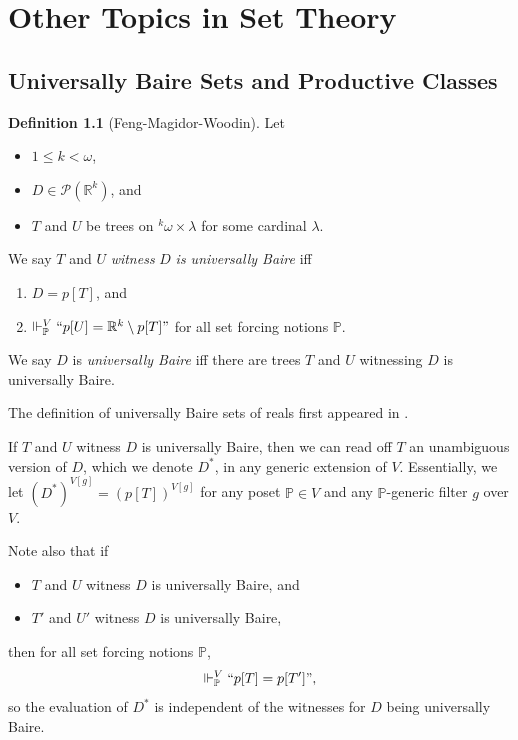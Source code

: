 \documentclass[12pt, twoside]{memoir}
\numberwithin{equation}{section}
\theoremstyle{definition}
\newtheorem{defi}[thm]{Definition}
\theoremstyle{remark}
\theoremstyle{definition}
\theoremstyle{definition}
\theoremstyle{definition}
\theoremstyle{remark}
\begin{document}
\chapter{Other Topics in Set Theory}\label{chap4}

\section{Universally Baire Sets and Productive Classes}\label{ss25}

\begin{defi}[Feng-Magidor-Woodin]
Let 
\begin{itemize}
    \item $1 \leq k < \omega$, 
    \item $D \in \mathcal{P}(\mathbb{R}^k)$, and
    \item $T$ and $U$ be trees on ${^{k}{\omega}} \times \lambda$ for some cardinal $\lambda$.
\end{itemize} 
We say $T$ and $U$ \emph{witness} $D$ \emph{is universally Baire} iff 
\begin{enumerate}[label=(\alph*)]
    \item $D = p[T]$, and
    \item $\Vdash^V_{\mathbb{P}} ``p[U] = \mathbb{R}^k \setminus p[T]"$ for all set forcing notions $\mathbb{P}$.
\end{enumerate}
We say $D$ is \emph{universally Baire} iff there are trees $T$ and $U$ witnessing $D$ is universally Baire.
\end{defi}

The definition of universally Baire sets of reals first appeared in \cite[Section 2]{fmw}. 

If $T$ and $U$ witness $D$ is universally Baire, then we can read off $T$ an unambiguous version of $D$, which we denote $D^*$, in any generic extension of $V$. Essentially, we let $(D^*)^{V[g]} = (p[T])^{V[g]}$ for any poset $\mathbb{P} \in V$ and any $\mathbb{P}$-generic filter $g$ over $V$.

Note also that if
\begin{itemize}
    \item $T$ and $U$ witness $D$ is universally Baire, and
    \item $T'$ and $U'$ witness $D$ is universally Baire,
\end{itemize}
then for all set forcing notions $\mathbb{P}$, 
\begin{equation*}
    \Vdash^V_{\mathbb{P}} ``p[T] = p[T']",
\end{equation*}
so the evaluation of $D^*$ is independent of the witnesses for $D$ being universally Baire.
\end{document}
